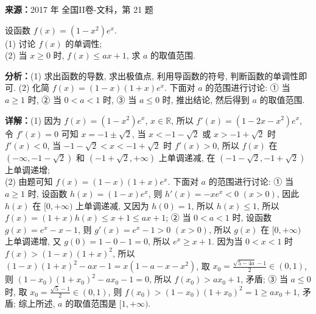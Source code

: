 \begin{question}[points=12]
\textbf{来源：}2017 年 全国II卷-文科，第 21 题\par
设函数 $f(x)=(1-x^2)e^x$. \\ (1) 讨论 $f(x)$ 的单调性; \\ (2) 当 $x\ge0$ 时, $f(x)\le ax+1$, 求 $a$ 的取值范围.
\begin{solution}

\textbf{分析：}(1) 求出函数的导数, 求出极值点, 利用导函数的符号, 判断函数的单调性即可. (2) 化简 $f(x)=(1-x)(1+x)e^x$. 下面对 $a$ 的范围进行讨论: ① 当 $a\ge1$ 时, ② 当 $0<a<1$ 时, ③ 当 $a\le0$ 时, 推出结论, 然后得到 $a$ 的取值范围.

\textbf{详解：}(1) 因为 $f(x)=(1-x^2)e^x$, $x\in\mathbb{R}$, 所以 $f'(x)=(1-2x-x^2)e^x$, 令 $f'(x)=0$ 可知 $x=-1\pm\sqrt{2}$, 当 $x<-1-\sqrt{2}$ 或 $x>-1+\sqrt{2}$ 时 $f'(x)<0$, 当 $-1-\sqrt{2}<x<-1+\sqrt{2}$ 时 $f'(x)>0$, 所以 $f(x)$ 在 $(-\infty,-1-\sqrt{2})$ 和 $(-1+\sqrt{2},+\infty)$ 上单调递减, 在 $(-1-\sqrt{2},-1+\sqrt{2})$ 上单调递增; \\ (2) 由题可知 $f(x)=(1-x)(1+x)e^x$. 下面对 $a$ 的范围进行讨论: ① 当 $a\ge1$ 时, 设函数 $h(x)=(1-x)e^x$, 则 $h'(x)=-xe^x<0$ $(x>0)$, 因此 $h(x)$ 在 $[0,+\infty)$ 上单调递减, 又因为 $h(0)=1$, 所以 $h(x)\le1$, 所以 $f(x)=(1+x)h(x)\le x+1\le ax+1$; ② 当 $0<a<1$ 时, 设函数 $g(x)=e^x-x-1$, 则 $g'(x)=e^x-1>0$ $(x>0)$, 所以 $g(x)$ 在 $[0,+\infty)$ 上单调递增, 又 $g(0)=1-0-1=0$, 所以 $e^x\ge x+1$. 因为当 $0<x<1$ 时 $f(x)>(1-x)(1+x)^2$, 所以 $(1-x)(1+x)^2-ax-1=x(1-a-x-x^2)$, 取 $x_0=\frac{\sqrt{5-4a}-1}{2}\in(0,1)$, 则 $(1-x_0)(1+x_0)^2-ax_0-1=0$, 所以 $f(x_0)>ax_0+1$, 矛盾; ③ 当 $a\le0$ 时, 取 $x_0=\frac{\sqrt{5}-1}{2}\in(0,1)$, 则 $f(x_0)>(1-x_0)(1+x_0)^2=1\ge ax_0+1$, 矛盾; 综上所述, $a$ 的取值范围是 $[1,+\infty)$.
\end{solution}
\end{question}

